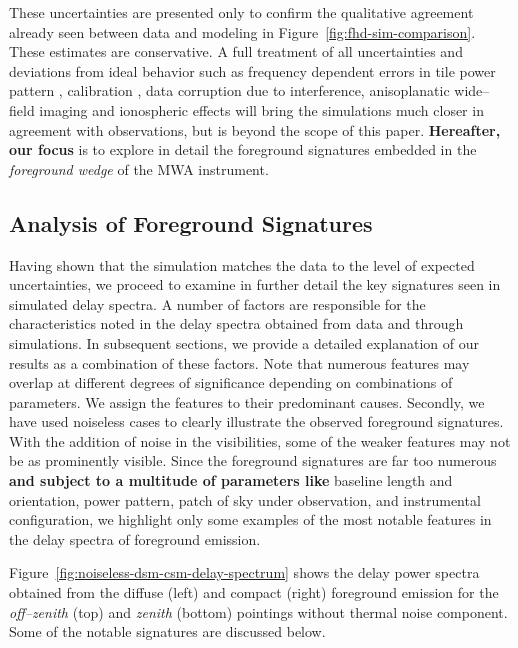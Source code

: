 \documentclass[preprint2,iop,numberedappendix,twocolappendix,appendixfloats]{emulateapj}
\begin{document}
These uncertainties are presented only to confirm the qualitative agreement already seen between data and modeling in Figure~\ref{fig:fhd-sim-comparison}. These estimates are conservative. A full treatment of all uncertainties and deviations from ideal behavior such as frequency dependent errors in tile power pattern \citep{ber15}, calibration \citep{dat10}, data corruption due to interference, anisoplanatic wide--field imaging and ionospheric effects \citep{int09} will bring the simulations much closer in agreement with observations, but is beyond the scope of this paper. {\bf Hereafter, our focus} is to explore in detail the foreground signatures embedded in the {\it foreground wedge} of the MWA instrument.

\subsection{Analysis of Foreground Signatures}\label{sec:FG-analysis}

Having shown that the simulation matches the data to the level of expected uncertainties, we proceed to examine in further detail the key signatures seen in simulated delay spectra. A number of factors are responsible for the characteristics noted in the delay spectra obtained from data and through simulations. In subsequent sections, we provide a detailed explanation of our results as a combination of these factors. Note that numerous features may overlap at different degrees of significance depending on combinations of parameters. We assign the features to their predominant causes. Secondly, we have used noiseless cases to clearly illustrate the observed foreground signatures. With the addition of noise in the visibilities, some of the weaker features may not be as prominently visible. Since the foreground signatures are far too numerous {\bf and subject to a multitude of parameters like} baseline length and orientation, power pattern, patch of sky under observation, and instrumental configuration, we highlight only some examples of the most notable features in the delay spectra of foreground emission.

Figure~\ref{fig:noiseless-dsm-csm-delay-spectrum} shows the delay power spectra obtained from the diffuse (left) and compact (right) foreground emission for the {\it off--zenith} (top) and {\it zenith} (bottom) pointings without thermal noise component. Some of the notable signatures are discussed below.
\end{document}
